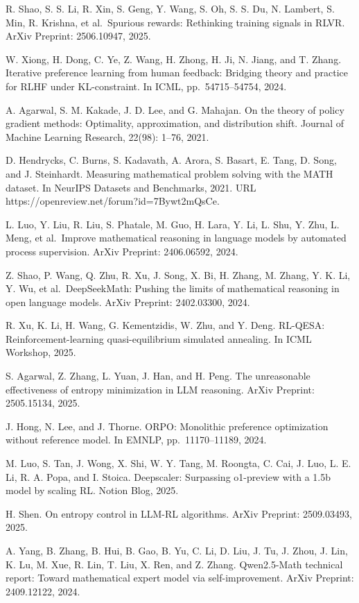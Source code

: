 \documentclass[
  10
]{article}
\begin{document}
R. Shao, S. S. Li, R. Xin, S. Geng, Y. Wang, S. Oh, S. S. Du, N.
Lambert, S. Min, R. Krishna, et al.~Spurious rewards: Rethinking
training signals in RLVR. ArXiv Preprint: 2506.10947, 2025.

W. Xiong, H. Dong, C. Ye, Z. Wang, H. Zhong, H. Ji, N. Jiang, and T.
Zhang. Iterative preference learning from human feedback: Bridging
theory and practice for RLHF under KL-constraint. In ICML,
pp.~54715--54754, 2024.

A. Agarwal, S. M. Kakade, J. D. Lee, and G. Mahajan. On the theory of
policy gradient methods: Optimality, approximation, and distribution
shift. Journal of Machine Learning Research, 22(98): 1--76, 2021.

D. Hendrycks, C. Burns, S. Kadavath, A. Arora, S. Basart, E. Tang, D.
Song, and J. Steinhardt. Measuring mathematical problem solving with the
MATH dataset. In NeurIPS Datasets and Benchmarks, 2021. URL
https://openreview.net/forum?id=7Bywt2mQsCe.

L. Luo, Y. Liu, R. Liu, S. Phatale, M. Guo, H. Lara, Y. Li, L. Shu, Y.
Zhu, L. Meng, et al.~Improve mathematical reasoning in language models
by automated process supervision. ArXiv Preprint: 2406.06592, 2024.

Z. Shao, P. Wang, Q. Zhu, R. Xu, J. Song, X. Bi, H. Zhang, M. Zhang, Y.
K. Li, Y. Wu, et al.~DeepSeekMath: Pushing the limits of mathematical
reasoning in open language models. ArXiv Preprint: 2402.03300, 2024.

R. Xu, K. Li, H. Wang, G. Kementzidis, W. Zhu, and Y. Deng. RL-QESA:
Reinforcement-learning quasi-equilibrium simulated annealing. In ICML
Workshop, 2025.

S. Agarwal, Z. Zhang, L. Yuan, J. Han, and H. Peng. The unreasonable
effectiveness of entropy minimization in LLM reasoning. ArXiv Preprint:
2505.15134, 2025.

J. Hong, N. Lee, and J. Thorne. ORPO: Monolithic preference optimization
without reference model. In EMNLP, pp.~11170--11189, 2024.

M. Luo, S. Tan, J. Wong, X. Shi, W. Y. Tang, M. Roongta, C. Cai, J. Luo,
L. E. Li, R. A. Popa, and I. Stoica. Deepscaler: Surpassing o1-preview
with a 1.5b model by scaling RL. Notion Blog, 2025.

H. Shen. On entropy control in LLM-RL algorithms. ArXiv Preprint:
2509.03493, 2025.

A. Yang, B. Zhang, B. Hui, B. Gao, B. Yu, C. Li, D. Liu, J. Tu, J. Zhou,
J. Lin, K. Lu, M. Xue, R. Lin, T. Liu, X. Ren, and Z. Zhang.
Qwen2.5-Math technical report: Toward mathematical expert model via
self-improvement. ArXiv Preprint: 2409.12122, 2024.
\end{document}

